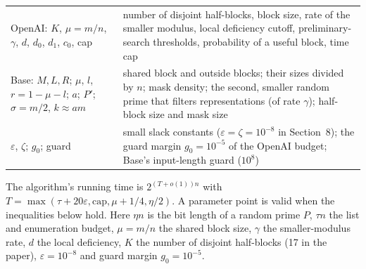 \documentclass[11pt]{article}
\newcommand{\eps}{\varepsilon}
\theoremstyle{plain}
\begin{document}
\begin{center}
\begin{tabularx}{\linewidth}{>{\raggedright\arraybackslash}p{4.4cm} L}
OpenAI: $K$, $\mu = m/n$, $\gamma$, $d$, $d_0$, $d_1$, $c_0$, cap & number of disjoint half-blocks, block size, rate of the smaller modulus, local deficiency cutoff, preliminary-search thresholds, probability of a useful block, time cap \\
Base: $M, L, R$; $\mu$, $l$, $r = 1 - \mu - l$; $a$; $P'$; $\sigma = m/2$, $k \approx am$ & shared block and outside blocks; their sizes divided by $n$; mask density; the second, smaller random prime that filters representations (of rate $\gamma$); half-block size and mask size \\
$\eps$, $\zeta$; $g_0$; guard & small slack constants ($\eps = \zeta = 10^{-8}$ in Section~8); the guard margin $g_0 = 10^{-5}$ of the OpenAI budget; Base's input-length guard ($10^8$) \\
\bottomrule
\end{tabularx}
\end{center}

The algorithm's running time is $2^{(T+o(1))n}$ with $T = \max(\tau + 20\eps, \mathrm{cap}, \mu + 1/4, \eta/2)$. A parameter point is valid when the inequalities below hold. Here $\eta n$ is the bit length of a random prime $P$, $\tau n$ the list and enumeration budget, $\mu = m/n$ the shared block size, $\gamma$ the smaller-modulus rate, $d$ the local deficiency, $K$ the number of disjoint half-blocks (17 in the paper), $\eps = 10^{-8}$ and guard margin $g_0 = 10^{-5}$.
\end{document}
